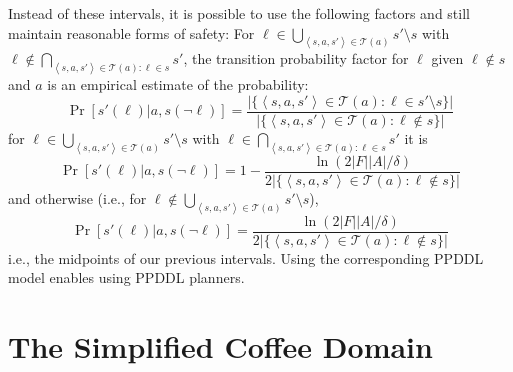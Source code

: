 \documentclass[letterpaper]{article} %
\newcommand{\tuple}[1]{\ensuremath{\left \langle #1 \right \rangle }}
\begin{document}
Instead of these intervals, it is possible to use the following factors and still maintain reasonable forms of safety: For $\ell\in\bigcup_{\tuple{s, a, s'}\in \mathcal{T}(a)} s'\setminus s $ with $\ell \notin \bigcap_{\tuple{s, a, s'}\in \mathcal{T}(a):\ell\in s}s'$, the transition probability factor for $\ell$ given $\ell\notin s$ and $a$ is an empirical estimate of the probability:
\begin{equation}
\label{eq:ppddl-exact}
\Pr[s'(\ell)|a,s(\neg\ell)]=\frac{|\{\tuple{s, a, s'}\in \mathcal{T}(a):\ell\in s'\setminus s\}|}{|\{\tuple{s, a, s'}\in \mathcal{T}(a):\ell \notin s\}|}
\end{equation}
for $\ell\in\bigcup_{\tuple{s, a, s'}\in \mathcal{T}(a)} s'\setminus s $ with $\ell \in \bigcap_{\tuple{s, a, s'}\in \mathcal{T}(a):\ell\in s}s'$ it is
\begin{equation}
\label{eq:ppddl-exact-det}
\Pr[s'(\ell)|a,s(\neg\ell)]=1-\frac{\ln(2|F||A|/\delta)}{2|\{\tuple{s, a, s'}\in \mathcal{T}(a):\ell\notin s\}|}
\end{equation}
and otherwise (i.e., for $\ell\notin\bigcup_{\tuple{s, a, s'}\in \mathcal{T}(a)} s'\setminus s $),
\begin{equation}
\label{eq:ppddl-exact-missing}
\Pr[s'(\ell)|a,s(\neg\ell)]=\frac{\ln(2|F||A|/\delta)}{2|\{\tuple{s, a, s'}\in \mathcal{T}(a):\ell\notin s\}|}
\end{equation}
i.e., the midpoints of our previous intervals.
Using the corresponding PPDDL model enables using PPDDL planners. 



\section{The Simplified Coffee Domain}




\end{document}
